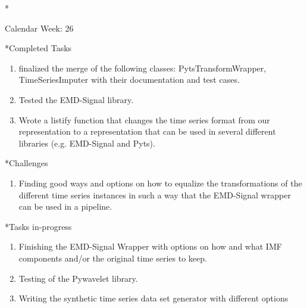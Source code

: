 \documentclass[11pt,a4paper]{article}
\begin{document}
\newpage
\begin{section}*{Calendar Week: 26 \hfill \date{02 July, 2021}}
	
	\begin{subsection}*{Completed Tasks}
		\begin{enumerate}
			\item finalized the merge of the following classes: PytsTransformWrapper, TimeSeriesImputer with their documentation and test cases.
			\item Tested the EMD-Signal library.
			\item Wrote a listify function that changes the time series format from our representation to a representation that can be used in several different libraries (e.g. EMD-Signal and Pyts).
		\end{enumerate}
	\end{subsection}

	\begin{subsection}*{Challenges}
	\begin{enumerate}
		\item Finding good ways and options on how to equalize the transformations of the different time series instances in such a way that the EMD-Signal wrapper can be used in a pipeline.
	\end{enumerate}
\end{subsection}
	
	\begin{subsection}*{Tasks in-progress}
		\begin{enumerate}
			\item Finishing the EMD-Signal Wrapper with options on how and what IMF components and/or the original time series to keep.
			\item Testing of the Pywavelet library.
			\item Writing the synthetic time series data set generator with different options
		\end{enumerate}
	\end{subsection}
	
\end{section}
\end{document}
